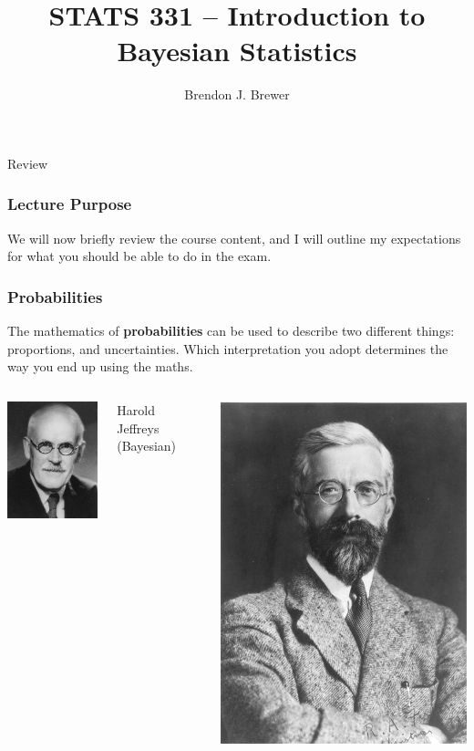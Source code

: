 \documentclass{beamer}
\author{Brendon J. Brewer}
\title{STATS 331 -- Introduction to Bayesian Statistics}
\institute{The University of Auckland}
\date{}
\begin{document}
\frame{\titlepage}

\begin{frame}
\Large

\begin{center}
Review
\end{center}
\end{frame}

\begin{frame}
\frametitle{Lecture Purpose}

We will now briefly review the course content, and I will outline my
expectations for what you should be able to do in the exam.

\end{frame}


\begin{frame}
\frametitle{Probabilities}
The mathematics of {\bf probabilities} can be used to describe two different
things: proportions, and uncertainties. Which interpretation you adopt
determines the way you end up using the maths.\pause

   \begin{columns} %

        \centering
        \includegraphics[width=0.5\linewidth]{images/jeffreys.jpg}

        Harold Jeffreys (Bayesian)

        \centering
        \includegraphics[width=0.5\linewidth]{images/fisher.jpg}


\end{columns}
\end{frame}
\end{document}
